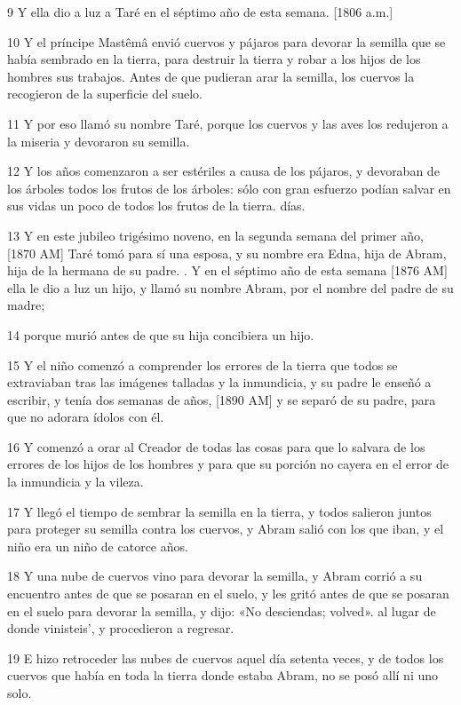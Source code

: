 \par 9 Y ella dio a luz a Taré en el séptimo año de esta semana. [1806 a.m.]
\par 10 Y el príncipe Mastêmâ envió cuervos y pájaros para devorar la semilla que se había sembrado en la tierra, para destruir la tierra y robar a los hijos de los hombres sus trabajos. Antes de que pudieran arar la semilla, los cuervos la recogieron de la superficie del suelo.
\par 11 Y por eso llamó su nombre Taré, porque los cuervos y las aves los redujeron a la miseria y devoraron su semilla.
\par 12 Y los años comenzaron a ser estériles a causa de los pájaros, y devoraban de los árboles todos los frutos de los árboles: sólo con gran esfuerzo podían salvar en sus vidas un poco de todos los frutos de la tierra. días.
\par 13 Y en este jubileo trigésimo noveno, en la segunda semana del primer año, [1870 AM] Taré tomó para sí una esposa, y su nombre era Edna, hija de Abram, hija de la hermana de su padre. . Y en el séptimo año de esta semana [1876 AM] ella le dio a luz un hijo, y llamó su nombre Abram, por el nombre del padre de su madre;
\par 14 porque murió antes de que su hija concibiera un hijo.
\par 15 Y el niño comenzó a comprender los errores de la tierra que todos se extraviaban tras las imágenes talladas y la inmundicia, y su padre le enseñó a escribir, y tenía dos semanas de años, [1890 AM] y se separó de su padre, para que no adorara ídolos con él.
\par 16 Y comenzó a orar al Creador de todas las cosas para que lo salvara de los errores de los hijos de los hombres y para que su porción no cayera en el error de la inmundicia y la vileza.
\par 17 Y llegó el tiempo de sembrar la semilla en la tierra, y todos salieron juntos para proteger su semilla contra los cuervos, y Abram salió con los que iban, y el niño era un niño de catorce años.
\par 18 Y una nube de cuervos vino para devorar la semilla, y Abram corrió a su encuentro antes de que se posaran en el suelo, y les gritó antes de que se posaran en el suelo para devorar la semilla, y dijo: «No desciendas; volved». al lugar de donde vinisteis', y procedieron a regresar.
\par 19 E hizo retroceder las nubes de cuervos aquel día setenta veces, y de todos los cuervos que había en toda la tierra donde estaba Abram, no se posó allí ni uno solo.
